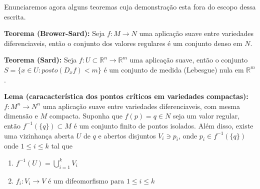\documentclass{article}
\begin{document}
	Enunciaremos agora alguns teoremas cuja demonstração esta fora do escopo dessa escrita.
	
	\vspace{2 mm}
	\textbf{Teorema (Brower-Sard):} Seja $f: M \to N$ uma aplicação suave entre variedades diferenciaveis, então o conjunto dos valores regulares é um conjunto denso em $N$.
	
	\vspace{2 mm}
	\textbf{Teorema (Sard):} Seja $f: U \subset \mathbb{R}^{n} \to \mathbb{R}^{m}$ uma aplicação suave, então o conjunto $S = \{x \in U: posto(D_{x}f) < m\}$ é um conjunto de medida (Lebesgue) nula em $\mathbb{R}^{m}$.
	
	\vspace{2 mm}
	\textbf{Lema (caracacterística dos pontos críticos em variedades compactas):} $f: M^{n} \to N^{n}$ uma aplicação suave entre variedades diferenciaveis, com mesma dimensão e $M$ compacta. Suponha que $f(p) = q \in N$ seja um valor regular, então $f^{-1}(\{q\}) \subset M$ é um conjunto finito de pontos isolados. Além disso, existe uma vizinhança aberta $U$ de $q$ e abertos disjuntos $V_{i} \ni p_{i}$, onde $p_{i} \in f^{-1}(\{q\})$ onde $1 \leq i \leq k$ tal que 
	\begin{enumerate}
		\item $f^{-1}(U) = \bigcup \limits_{i=1}^{k} V_{i}$
		
		\item $f_{i}:V_{i} \to V$ é um difeomorfismo para $1 \leq i \leq k$
	\end{enumerate}
\end{document}
